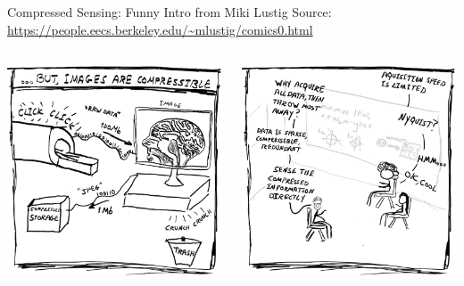 \documentclass[aspectratio=169]{beamer}
\begin{document}
	\begin{frame}{Compressed Sensing: Funny Intro from Miki Lustig}
		Source: \url{https://people.eecs.berkeley.edu/~mlustig/comics0.html}
		\vspace{1em}
		\begin{columns}
			\centering
			\includegraphics[width=\columnwidth]{figures/cs-lustig-comics-03.png}
			
			\centering
			\includegraphics[width=\columnwidth]{figures/cs-lustig-comics-04.png}
		\end{columns}
	\end{frame}
	
\end{document}
